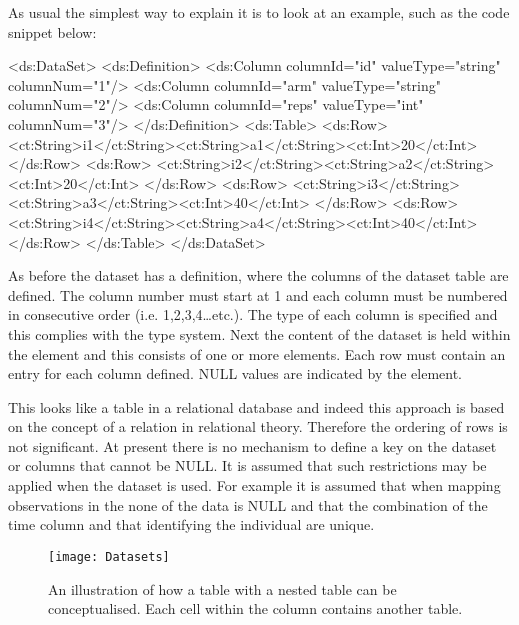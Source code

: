 As usual the simplest way to explain it is to look at an example, such
as the code snippet below:
%
\begin{xmlcode}
<ds:DataSet>
    <ds:Definition>
        <ds:Column columnId="id" valueType="string" columnNum="1"/>
        <ds:Column columnId="arm" valueType="string" columnNum="2"/>
        <ds:Column columnId="reps" valueType="int" columnNum="3"/>
    </ds:Definition>
    <ds:Table>
        <ds:Row>
            <ct:String>i1</ct:String><ct:String>a1</ct:String><ct:Int>20</ct:Int>
        </ds:Row>
        <ds:Row>
            <ct:String>i2</ct:String><ct:String>a2</ct:String><ct:Int>20</ct:Int>
        </ds:Row>
        <ds:Row>
            <ct:String>i3</ct:String><ct:String>a3</ct:String><ct:Int>40</ct:Int>
        </ds:Row>
        <ds:Row>
            <ct:String>i4</ct:String><ct:String>a4</ct:String><ct:Int>40</ct:Int>
        </ds:Row>
    </ds:Table>
</ds:DataSet>
\end{xmlcode}
%
As before the dataset has a definition, where the columns of the
dataset table are defined. The column number must start at 1 and each
column must be numbered in consecutive order (i.e.\xspace
1,2,3,4\ldots etc.). The type of each column is specified and this
complies with the \pharmml type system.  Next the content of the
dataset is held within the  element and this consists of
one or more  elements. Each row must contain an entry for
each column defined. NULL values are indicated by the 
element.

This looks like a table in a relational database and indeed this
approach is based on the concept of a relation in relational
theory. Therefore the ordering of rows is not significant. At present
there is no mechanism to define a key on the dataset or columns that
cannot be NULL. It is assumed that such restrictions may be applied when
the dataset is used. For example it is assumed that when mapping
observations in the  none of the data is
NULL and that the combination of the time column and that identifying
the individual are unique.

\begin{figure}[htb]
\centering
\texttt{[image: Datasets]}%
\caption{An illustration of how a table with a nested table can be
  conceptualised. Each cell within the  column contains
  another table.}
\label{fig:dataset}
\end{figure}

